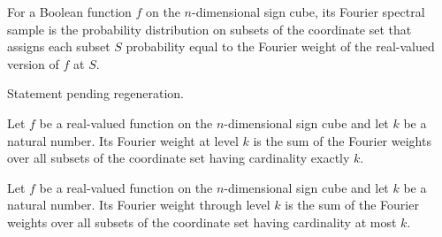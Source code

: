\begin{definition}
\label{FABL.spectralSample}
\leanok
{}
For a Boolean function $f$ on the $n$-dimensional sign cube, its Fourier spectral sample
is the probability distribution on subsets of the coordinate set that assigns each
subset $S$ probability equal to the Fourier weight of the real-valued version of $f$ at
$S$.
\end{definition}

\begin{theorem}
\label{FABL.spectralSample_apply_toReal}
\leanok
{}
Statement pending regeneration.
\end{theorem}

\begin{definition}
\label{FABL.fourierWeightAtLevel}
\leanok
{}
Let $f$ be a real-valued function on the $n$-dimensional sign cube and let $k$ be a
natural number. Its Fourier weight at level $k$ is the sum of the Fourier weights over
all subsets of the coordinate set having cardinality exactly $k$.
\end{definition}

\begin{definition}
\label{FABL.fourierWeightAtMost}
\leanok
{}
Let $f$ be a real-valued function on the $n$-dimensional sign cube and let $k$ be a
natural number. Its Fourier weight through level $k$ is the sum of the Fourier weights
over all subsets of the coordinate set having cardinality at most $k$.
\end{definition}

